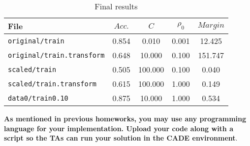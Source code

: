 \begin{enumerate}
\begin{itemize}
\begin{table}[!h]
\centering
\caption{Final results}
\begin{tabular}{l | c c c c}
\hline\hline
{\bf File} & $Acc.$ & $C$ & $\rho_{0}$ & $Margin$\\
\hline
\verb~original/train~ & 0.854 & \phantom{10}0.010 & 0.001 & \phantom{1}12.425\\
\verb~original/train.transform~ & 0.648 & \phantom{1}10.000 & 0.100 & 151.747\\
\verb~scaled/train~ & 0.505 & 100.000& 0.100 & \phantom{11}0.040\\
\verb~scaled/train.transform~ & 0.615 & 100.000& 1.000 & \phantom{11}0.149\\
\verb~data0/train0.10~ & 0.875 & \phantom{1}10.000 & 1.000 & \phantom{11}0.534\\
\hline\hline
\end{tabular}
\end{table}
\end{itemize}

\end{enumerate}

{\bf As mentioned in previous homeworks, you may use any programming
  language for your implementation. Upload your code along with a
  script so the TAs can run your solution in the CADE environment}.



